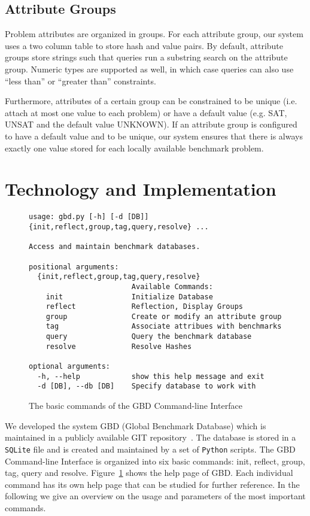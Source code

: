 \documentclass{easychair}
\begin{document}
\subsection{Attribute Groups}

Problem attributes are organized in groups. For each attribute group, our system uses a two column table to store hash and value pairs. By default, attribute groups store strings such that queries run a substring search on the attribute group. Numeric types are supported as well, in which case queries can also use ``less than'' or ``greater than'' constraints. 

Furthermore, attributes of a certain group can be constrained to be unique (i.e. attach at most one value to each problem) or have a default value (e.g. SAT, UNSAT and the default value UNKNOWN). If an attribute group is configured to have a default value and to be unique, our system ensures that there is always exactly one value stored for each locally available benchmark problem.

\section{Technology and Implementation}
\label{sec:implementation}

\begin{figure}[t]
\begin{verbatim}
usage: gbd.py [-h] [-d [DB]] {init,reflect,group,tag,query,resolve} ...

Access and maintain benchmark databases.

positional arguments:
  {init,reflect,group,tag,query,resolve}
                        Available Commands:
    init                Initialize Database
    reflect             Reflection, Display Groups
    group               Create or modify an attribute group
    tag                 Associate attribues with benchmarks
    query               Query the benchmark database
    resolve             Resolve Hashes

optional arguments:
  -h, --help            show this help message and exit
  -d [DB], --db [DB]    Specify database to work with

\end{verbatim}
\caption{The basic commands of the GBD Command-line Interface}
\label{fig:cli}
\end{figure}

We developed the system GBD (Global Benchmark Database) which is maintained in a publicly available GIT repository~\cite{GbdRepo}. The database is stored in a \texttt{SQLite} file and is created and maintained by a set of \texttt{Python} scripts. The GBD Command-line Interface is organized into six basic commands: \textsf{init, reflect, group, tag, query} and \textsf{resolve}. Figure~\ref{fig:cli} shows the help page of GBD. Each individual command has its own help page that can be studied for further reference. In the following we give an overview on the usage and parameters of the most important commands.
\end{document}
